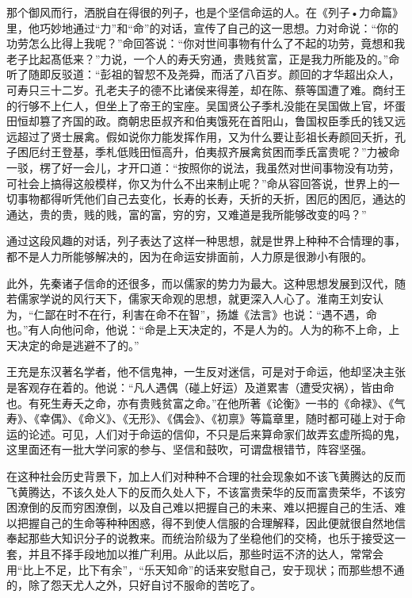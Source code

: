 \documentclass[a5paper,oneside,12pt]{ctexbook}
\begin{document}
那个御风而行，洒脱自在得很的列子，也是个坚信命运的人。在《列子•力命篇》里，他巧妙地通过“力”和“命”的对话，宣传了自己的这一思想。力对命说：“你的功劳怎么比得上我呢？”命回答说：“你对世间事物有什么了不起的功劳，竟想和我老子比起髙低来？”力说，一个人的寿夭穷通，贵贱贫富，正是我力所能及的。”命听了随即反驳道：“彭祖的智恝不及尧舜，而活了八百岁。颜回的才华超出众人，可寿只三十二岁。孔老夫子的德不比诸侯来得差，却在陈、蔡等国遭了难。商纣王的行够不上仁人，但坐上了帝王的宝座。吴国贤公子季札没能在吴国做上官，坏蛋田恒却篡了齐国的政。商朝忠臣叔齐和伯夷饿死在首阳山，鲁国权臣季氏的钱又远远超过了贤士展禽。假如说你力能发挥作用，又为什么要让彭祖长寿颜回夭折，孔子困厄纣王登基，季札低贱田恒高升，伯夷叔齐展禽贫困而季氏富贵呢？”力被命一驳，楞了好一会儿，才开口道：“按照你的说法，我虽然对世间事物没有功劳，可社会上搞得这般模样，你又为什么不出来制止呢？”命从容回答说，世界上的一切事物都得听凭他们自己去变化，长寿的长寿，夭折的夭折，困厄的困厄，通达的通达，贵的贵，贱的贱，富的富，穷的穷，又难道是我所能够改变的吗？”

通过这段风趣的对话，列子表达了这样一种思想，就是世界上种种不合情理的事，都不是人力所能够解决的，因为在命运安排面前，人力原是很渺小有限的。

此外，先秦诸子信命的还很多，而以儒家的势力为最大。这种思想发展到汉代，随若儒家学说的风行天下，儒家天命观的思想，就更深入人心了。淮南王刘安认为，“仁鄙在时不在行，利害在命不在智”，扬雄《法言》也说：“遇不遇，命也。”有人向他问命，他说：“命是上天决定的，不是人为的。人为的称不上命，上天决定的命是逃避不了的。”

王充是东汉著名学者，他不信鬼神，一生反对迷信，可是对于命运，他却坚决主张是客观存在着的。他说：“凡人遇偶（碰上好运）及道累害（遭受灾祸），皆由命也。有死生寿夭之命，亦有贵贱贫富之命。”在他所著《论衡》一书的《命禄》、《气寿》、《幸偶》、《命义》、《无形》、《偶会》、《初禀》等篇章里，随时都可碰上对于命运的论述。可见，人们对于命运的信仰，不只是后来算命家们故弄玄虚所捣的鬼，这里面还有一批大学问家的参与、坚信和鼓吹，可谓盘根错节，阵容坚强。

在这种社会历史背景下，加上人们对种种不合理的社会现象如不该飞黄腾达的反而飞黄腾达，不该久处人下的反而久处人下，不该富贵荣华的反而富贵荣华，不该穷困潦倒的反而穷困潦倒，以及自己难以把握自己的未来、难以把握自己的生活、难以把握自己的生命等种种困惑，得不到使人信服的合理解释，因此便就很自然地信奉起那些大知识分子的说教来。而统治阶级为了坐稳他们的交椅，也乐于接受这一套，并且不择手段地加以推广利用。从此以后，那些时运不济的达人，常常会用“比上不足，比下有余”，“乐天知命”的话来安慰自己，安于现状；而那些想不通的，除了怨天尤人之外，只好自讨不服命的苦吃了。
\end{document}
